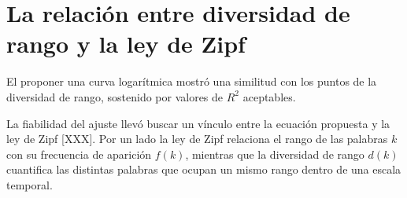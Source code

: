 

\section{La relación entre diversidad de rango y la ley de Zipf}

El proponer una curva logarítmica mostró una similitud con los puntos de la diversidad de rango, sostenido por valores de $R^{2}$ aceptables. 
 
La fiabilidad del ajuste llevó buscar un vínculo entre la ecuación propuesta y  la ley de Zipf [XXX]. Por un lado la ley de Zipf relaciona el rango de las palabras $k$ con su frecuencia de aparición $f(k)$,  mientras que la diversidad de rango $d(k) $cuantifica las distintas palabras que ocupan un mismo rango dentro de una escala temporal.  

